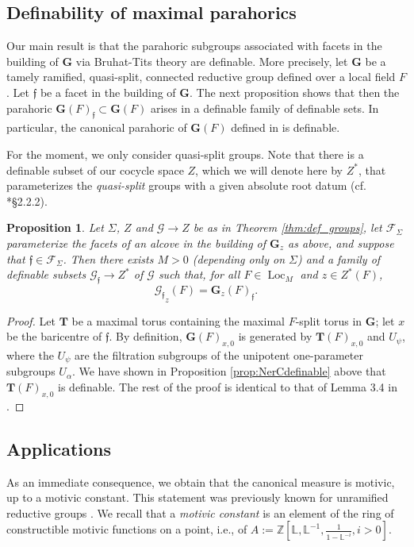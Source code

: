 \documentclass{amsart}
\newcommand{\Z}{{\mathbb Z}}
\newcommand{\cF}{\mathcal{F}}
\newcommand{\loc}{\operatorname{Loc}}
\newcommand{\bG}{\mathbf{G}}
\newcommand{\bT}{\mathbf {T}}
\newcommand{\cG}{\mathcal{G}}
\newcommand{\ff}{{\mathfrak f}}
\newcommand\lef{\mathbb L}
\theoremstyle{plain}
\newtheorem{prop}[thm]{Proposition}
\theoremstyle{definition}
\begin{document}
\subsection{Definability of maximal parahorics} 
Our main result is that 
the parahoric subgroups associated with facets in the building of $\bG$ via Bruhat-Tits theory are definable.  
More precisely, let $\bG$ be a tamely ramified, quasi-split, connected reductive group defined over a local field $F$. Let $\ff$ be a facet in the building of $\bG$.  The next proposition shows that
then the parahoric $\bG(F)_\ff\subset \bG(F)$ arises in a definable family of definable sets. 
In particular, the canonical parahoric of $\bG(F)$ defined in \cite{gross:motive} is definable. 

For the moment, we only consider quasi-split groups. 
Note that there is a definable subset of our cocycle space $Z$, which we will denote here by $Z^\ast$,
that parameterizes the \emph{quasi-split} groups with a given absolute root datum (cf. \cite{hales:transfert}*{\S 2.2.2}).  

\begin{prop}\label{prop:main} \todo{Doesn't $\cF_\Sigma$ depend on $z$?}
 Let $\Sigma$, $Z$ and $\cG\to Z$ be as in Theorem \ref{thm:def_groups}, let 
 $\cF_{\Sigma}$ parameterize the facets of an alcove in the building of $\bG_z$ as above,
 and suppose that $\ff \in \cF_\Sigma$.  
Then there exists $M>0$ (depending only on $\Sigma$) and a family of definable subsets $\cG_{\ff} \to Z^\ast$ of $\cG$
 such that, for all $F\in \loc_M$ and $z\in Z^\ast(F)$, 
\[
{\cG_{\ff}}_{z}(F)= \bG_z(F)_{\ff}.
\]
\end{prop}

\begin{proof} Let $\bT$ be a maximal torus containing the maximal $F$-split torus in $\bG$; let $x$ be the baricentre of $\ff$.
By definition, $\bG(F)_{x,0}$ is generated by $\bT(F)_{x, 0}$ and $U_\psi$, where the $U_\psi$ are
the filtration subgroups of the unipotent one-parameter subgroups $U_{\alpha}$. 
We have shown in Proposition \ref{prop:NerCdefinable} above that  $\bT(F)_{x, 0}$ is definable.
The rest of the proof is identical to that of Lemma 3.4 in \cite{CGH-2}.  
\end{proof} 

\subsection{Applications} 
As an immediate consequence, we obtain that the canonical measure is motivic, up to a motivic constant. This statement was previously known for unramified reductive groups \cite{cluckers-hales-loeser}.
We recall that a \emph{motivic constant} is an element of the ring of constructible motivic functions on a point, i.e.,  of $A:=\Z[\lef, \lef^{-1}, \frac{1}{1-\lef^{-i}}, i>0]$. \todo{define $\lef$}
 
\end{document}
